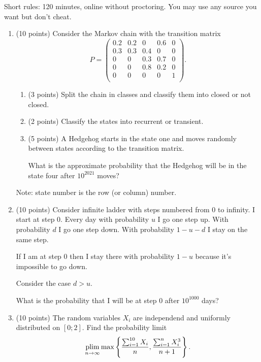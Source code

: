 Short rules: 120 minutes, online without proctoring. You may use any source you want but don't cheat.

\begin{enumerate}

\item (10 points) Consider the Markov chain with the transition matrix
\[
  P = \begin{pmatrix}
    0.2 & 0.2 & 0 & 0.6 & 0 \\
    0.3 & 0.3 & 0.4 & 0 & 0\\
    0 & 0 & 0.3 & 0.7 & 0 \\
    0 & 0 & 0.8 & 0.2 & 0 \\
    0 & 0 & 0 & 0 & 1 \\
  \end{pmatrix}.
\]

\begin{enumerate}
  \item (3 points) Split the chain in classes and classify them into closed or not closed.
  \item (2 points) Classify the states into recurrent or transient.
  \item (5 points) A Hedgehog starts in the state one and moves 
  randomly between states according to the transition matrix.

  What is the approximate probability that the Hedgehog will be in the 
  state four after $10^{2021}$ moves?
\end{enumerate}

Note: state number is the row (or column) number.

  \item (10 points) Consider infinite ladder with steps numbered from $0$ to infinity. 
  I start at step $0$. Every day with probability $u$ I go one step up.
  With probability $d$ I go one step down. With probability $1-u-d$ I stay on the same step.

  If I am at step $0$ then I stay there with probability $1-u$ because it's impossible to go down. 

  Consider the case $d>u$. 
  
  What is the probability that I will be at step $0$ after $10^{1000}$ days?

  \item (10 points) The random variables $X_i$ are independend and uniformly distributed on $[0;2]$.
  Find the probability limit
\[
\operatorname*{plim}_{n\to\infty}  \max \left\{ \frac{\sum_{i=1}^{10} X_i}{n}, \frac{\sum_{i=1}^n X^3_i}{n+1} \right\}.
\]



\end{enumerate}
